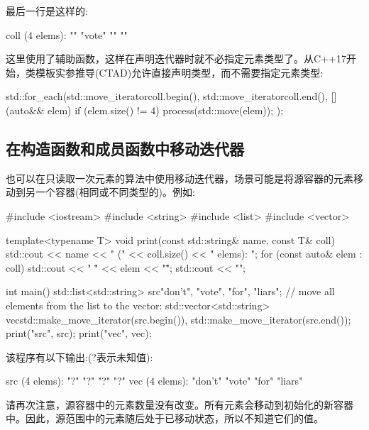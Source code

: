 最后一行是这样的:

\begin{outputcode}
coll (4 elems): "" "vote" "" ""
\end{outputcode}

这里使用了辅助函数，这样在声明迭代器时就不必指定元素类型了。从C++17开始，类模板实参推导(CTAD)允许直接声明类型，而不需要指定元素类型:

\begin{cppcode}
std::for_each(std::move_iterator{coll.begin()},
std::move_iterator{coll.end()},
[] (auto&& elem) {
	if (elem.size() != 4) {
		process(std::move(elem));
	}
});
\end{cppcode}

\subsection{在构造函数和成员函数中移动迭代器}

也可以在只读取一次元素的算法中使用移动迭代器，场景可能是将源容器的元素移动到另一个容器(相同或不同类型的)。例如:

\begin{cppcode}
#include <iostream>
#include <string>
#include <list>
#include <vector>

template<typename T>
void print(const std::string& name, const T& coll)
{
	std::cout << name << " (" << coll.size() << " elems): ";
	for (const auto& elem : coll) {
		std::cout << " \"" << elem << "\"";
	}
	std::cout << "\n";
}

int main()
{
	std::list<std::string> src{"don't", "vote", "for", "liars"};
	// move all elements from the list to the vector:
	std::vector<std::string> vec{std::make_move_iterator(src.begin()),
		std::make_move_iterator(src.end())};
	print("src", src);
	print("vec", vec);
}
\end{cppcode}

该程序有以下输出:(?表示未知值):

\begin{outputcode}
src (4 elems): "?" "?" "?" "?"
vec (4 elems): "don't" "vote" "for" "liars"
\end{outputcode}

请再次注意，源容器中的元素数量没有改变。所有元素会移动到初始化的新容器中。因此，源范围中的元素随后处于已移动状态，所以不知道它们的值。













